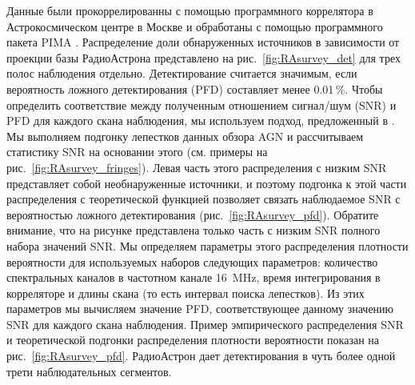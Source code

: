 Данные были прокоррелированны с помощью программного коррелятора в Астрокосмическом центре в Москве
\cite{Likhachev_2017} и обработаны с помощью программного пакета PIMA \cite{Petrov_2011}.
Распределение доли обнаруженных источников в зависимости от проекции базы РадиоАстрона представлено
на рис.~\ref{fig:RAsurvey_det} для трех полос наблюдения отдельно. Детектирование считается
значимым, если вероятность ложного детектирования (PFD) составляет менее 0.01\,\%. Чтобы определить
соответствие между полученным отношением сигнал/шум (SNR) и PFD для каждого скана наблюдения, мы
используем подход, предложенный в \cite{Petrov_2011}. Мы выполняем подгонку лепестков данных обзора
AGN и рассчитываем статистику SNR на основании этого (см. примеры на
рис.~\ref{fig:RAsurvey_fringes}). Левая часть этого распределения с низким SNR представляет собой
необнаруженные источники, и поэтому подгонка к этой части распределения с теоретической функцией
позволяет связать наблюдаемое SNR с вероятностью ложного детектирования
(рис.~\ref{fig:RAsurvey_pfd}). Обратите внимание, что на рисунке представлена ​​только часть с
низким SNR полного набора значений SNR. Мы определяем параметры этого распределения плотности
вероятности для используемых наборов следующих параметров: количество спектральных каналов в
частотном канале \SI{16}{\MHz}, время интегрирования в корреляторе и длины скана (то есть интервал
поиска лепестков). Из этих параметров мы вычисляем значение PFD, соответствующее данному значению
SNR для каждого скана наблюдения. Пример эмпирического распределения SNR и теоретической подгонки
распределения плотности вероятности показан на рис.~\ref{fig:RAsurvey_pfd}. РадиоАстрон дает
детектирования в чуть более одной трети наблюдательных сегментов.

